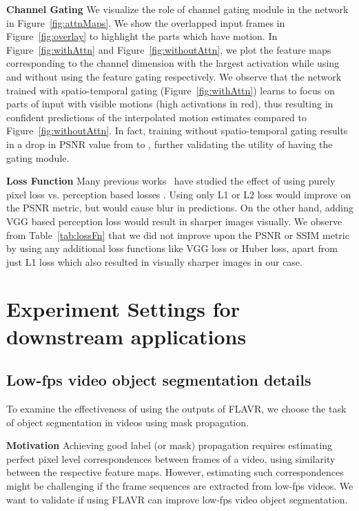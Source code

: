 \documentclass[10pt,twocolumn,letterpaper]{article}
\newcommand{\figref}[1]{Figure~\ref{#1}}
\newcommand{\tabref}[1]{Table~\ref{#1}}
\newcommand{\Ours}{FLAVR}
\begin{document}
\begin{table*}[!t]
{\bf Channel Gating} We visualize the role of channel gating module in the network in \figref{fig:attnMaps}. We show the overlapped input frames in \figref{fig:overlay} to highlight the parts which have motion. In \figref{fig:withAttn} and \figref{fig:withoutAttn}, we plot the feature maps corresponding to the channel dimension with the largest activation while using and without using the feature gating respectively. We observe that the network trained with spatio-temporal gating (\figref{fig:withAttn}) learns to focus on parts of input with visible motions (high activations in red), thus resulting in confident predictions of the interpolated motion estimates compared to \figref{fig:withoutAttn}. In fact, training without spatio-temporal gating results in a drop in PSNR value from  to , further validating the utility of having the gating module.

{\bf Loss Function} Many previous works~\cite{niklaus2017video} have studied the effect of using purely pixel loss vs. perception based losses \cite{johnson2016perceptual}. Using only L1 or L2 loss would improve on the PSNR metric, but would cause blur in predictions. On the other hand, adding VGG based perception loss would result in sharper images visually. We observe from \tabref{tab:lossFn} that we did not improve upon the PSNR or SSIM metric by using any additional loss functions like VGG loss or Huber loss, apart from just L1 loss which also resulted in visually sharper images in our case.  

\section{Experiment Settings for downstream applications}

\subsection{Low-fps video object segmentation details}


To examine the effectiveness of using the outputs of \Ours{}, we choose the task of object segmentation in videos using mask propagation. 

{\bf Motivation} Achieving good label (or mask) propagation requires estimating perfect pixel level correspondences between frames of a video, using similarity between the respective feature maps. However, estimating such correspondences might be challenging if the frame sequences are extracted from low-fps videos. We want to validate if using \Ours{} can improve low-fps video object segmentation.


\end{table*}
\end{document}
